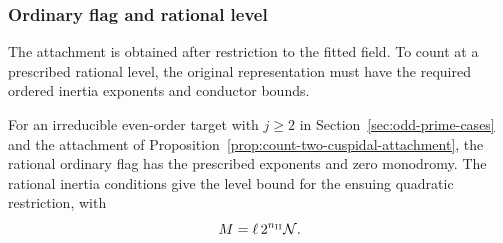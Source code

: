 \subsubsection{Ordinary flag and rational level}
\label{par:count-two-host-level}

The attachment is obtained after restriction to the fitted field. To count at a prescribed rational level, the original representation must have the required ordered inertia exponents and conductor bounds.

\begin{proposition}\label{prop:count-two-rational-level}
For an irreducible even-order target with \(j\ge2\) in
Section~\ref{sec:odd-prime-cases} and the attachment of
Proposition~\ref{prop:count-two-cuspidal-attachment}, the rational
ordinary flag has the prescribed exponents and zero monodromy.
The rational inertia conditions give the level bound for the ensuing quadratic restriction, with 
\[
 M=\ell\,2^{n_{\rm II}}\mathcal N.
\]

\end{proposition}


